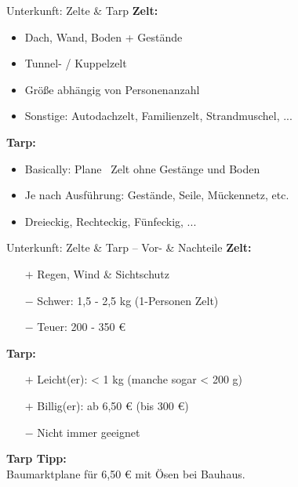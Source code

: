 \documentclass{beamer}
\begin{document}
			\begin{frame}{Unterkunft: Zelte \& Tarp}
				\textbf{Zelt:}
				\begin{itemize}
					\item Dach, Wand, Boden + Gestände
					\item Tunnel- / Kuppelzelt
					\item Größe abhängig von Personenanzahl
					\item Sonstige: Autodachzelt, Familienzelt, Strandmuschel, ...
				\end{itemize}\pause
				\textbf{Tarp:}
				\begin{itemize}
					\item Basically: Plane \textrightarrow\ Zelt ohne Gestänge und Boden
					\item Je nach Ausführung: Gestände, Seile, Mückennetz, etc.
					\item Dreieckig, Rechteckig, Fünfeckig, ...
				\end{itemize}
			\end{frame}
			
			\begin{frame}{Unterkunft: Zelte \& Tarp -- Vor- \& Nachteile}
				\textbf{Zelt:}
				\begin{itemize}
					\item[$+$] Regen, Wind \& Sichtschutz
					\item[$-$] Schwer: 1,5 - 2,5 kg (1-Personen Zelt)
					\item[$-$] Teuer: 200 - 350 €
				\end{itemize}\pause
				\textbf{Tarp:}
				\begin{itemize}
					\item[$+$] Leicht(er): < 1 kg (manche sogar < 200 g)
					\item[$+$] Billig(er): ab 6,50 € (bis 300 €)
					\item[$-$] Nicht immer geeignet
				\end{itemize}\pause
				\vspace{0.2cm}
				\textbf{Tarp Tipp:}\\Baumarktplane für 6,50 € mit Ösen bei Bauhaus.
			\end{frame}
			
\end{document}
